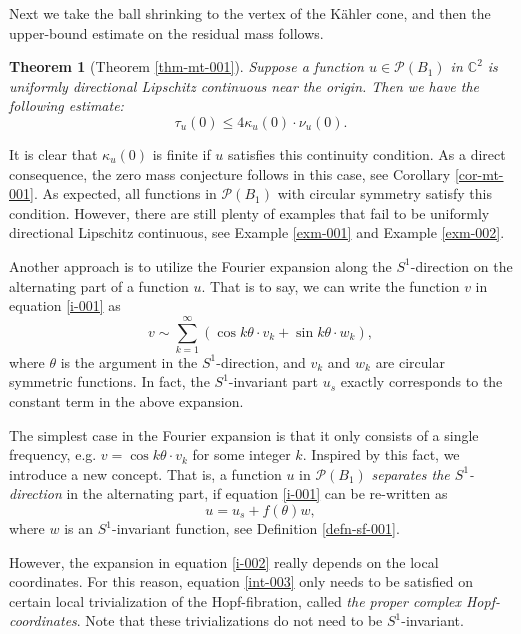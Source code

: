 \documentclass[a4paper,11pt]{amsart}
\numberwithin{equation}{section}
\newtheorem{theorem}{Theorem}[section]
\def\cP{{\mathcal P}}
\def\cP{{\mathcal P}}
\def\bC{{\mathbb C}}
\def\k{{\kappa}}
\begin{document}
Next we take the ball shrinking to the vertex of the K\"ahler cone, 
and then the upper-bound estimate on the residual mass follows.  

\begin{theorem}[Theorem \ref{thm-mt-001}]
\label{thm-int-001}
Suppose a function $u\in\cP(B_1)$ in $\bC^2$ is uniformly directional Lipschitz continuous 
near the origin. 
Then we have the following estimate:
\begin{equation}
\label{int-0011}
\tau_u(0) \leq 4 \k_u(0) \cdot \nu_u(0).
\end{equation}
\end{theorem}

It is clear that $\k_u(0)$ is finite if $u$ satisfies this continuity condition. 
As a direct consequence, 
the zero mass conjecture follows in this case,
see Corollary \ref{cor-mt-001}. 
As expected, 
all functions in $\cP(B_1)$ with circular symmetry 
satisfy this condition. 
However, 
there are still plenty of examples that fail to be uniformly directional Lipschitz continuous, 
see Example \ref{exm-001} and Example \ref{exm-002}. 


Another approach
is to utilize the Fourier expansion along the $S^1$-direction on the alternating part of a function $u$. 
That is to say, we can write the function $v$ in equation \eqref{i-001} as 
\begin{equation}
\label{i-002}
 v \sim \sum_{k=1}^{\infty} \left( \cos k\theta \cdot v_k  +   \sin k\theta \cdot w_k  \right), 
\end{equation}
where $\theta$ is the argument in the $S^1$-direction, 
and $v_k$ and $w_k$ are circular symmetric functions. 
In fact, the $S^1$-invariant part $u_s$ exactly corresponds to 
the constant term in the above expansion. 

The simplest case in the Fourier expansion is that 
it only consists of a single frequency, e.g. 
$v = \cos k\theta \cdot v_k$
for some integer $k$.
Inspired by this fact, 
we introduce a new concept. 
That is, a function $u$ in $\cP(B_1)$ 
\emph{separates the $S^1$-direction} in the alternating part,
if equation \eqref{i-001} can be re-written as 
\begin{equation}
\label{int-003}
u = u_s + f(\theta) w,
\end{equation}
where $w$ is an $S^1$-invariant function, see Definition \ref{defn-sf-001}. 

However, 
the expansion in equation \eqref{i-002} really depends on the local coordinates. 
For this reason, equation \eqref{int-003} only needs to be satisfied on 
certain local trivialization of the Hopf-fibration,
called \emph{the proper complex Hopf-coordinates}. 
Note that these trivializations do not need to be $S^1$-invariant. 
\end{document}
